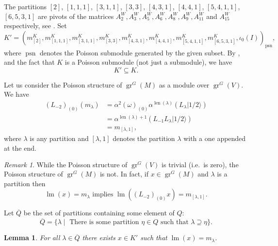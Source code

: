 \documentclass[12pt, a4paper]{article}
\newtheorem{lemma}[theorem]{Lemma}
\theoremstyle{remark}
\newtheorem{remark}[theorem]{Remark}
\DeclareMathOperator{\gr}{gr}
\DeclareMathOperator{\lm}{lm}
\DeclareMathOperator{\len}{len}
\DeclareMathOperator{\psn}{psn}
\newcommand{\vachalf}{|1/2\rangle}
\begin{document}
The partitions $[2]$, $[1, 1, 1]$, $[3, 1, 1]$, $[3, 3]$, $[4, 3, 1]$, $[4, 4, 1]$, $[5, 4, 1, 1]$, $[6, 5, 3, 1]$ are pivots of the matrices $A^W_2, A^W_3, A^W_5, A^W_6, A^W_8, A^W_9, A^W_{11}$ and $A^W_{15}$ respectively, see .
Set
\begin{equation*}
  K' = (m^K_{[2]}, m^K_{[1, 1, 1]}, m^K_{[3, 1, 1]}, m^K_{[3, 3]}, m^K_{[4, 3, 1]}, m^K_{[4, 4, 1]}, m^K_{[5, 4, 1, 1]}, m^K_{[6, 5, 3, 1]}, \iota_0(I))_{\psn},
\end{equation*}
where $\psn$ denotes the Poisson submodule generated by the given subset.
By ,  and the fact that $K$ is a Poisson submodule (not just a submodule), we have
\begin{equation*}
K' \subseteq K.
\end{equation*}

Let us consider the Poisson structure of $\gr^G(M)$ as a module over $\gr^G(V)$.
We have
\begin{align*}
  (L_{-2})_{(0)}(m_\lambda) &= \alpha^2(\omega)_{(0)}\alpha^{\len(\lambda)}(L_\lambda\vachalf) \\
  &= \alpha^{\len(\lambda) + 1}(L_{-1}L_\lambda\vachalf) \\
  &= m_{[\lambda, 1]},
\end{align*}
where $\lambda$ is any partition and $[\lambda, 1]$ denotes the partition $\lambda$ with a one appended at the end.
\begin{remark}
  \label{rmk:3}
  While the Poisson structure of $\gr^G(V)$ is trivial (i.e.\ is zero), the Poisson structure of $\gr^G(M)$ is not.
  In fact, if $x \in \gr^G(M)$ and $\lambda$ is a partition then
  \begin{equation*}
    \lm(x) = m_\lambda \text{ implies } \lm((L_{-2})_{(0)}x) = m_{[\lambda,1]}.
  \end{equation*}
\end{remark}

Let $\overline{Q}$ be the set of partitions containing some element of $Q$:
\begin{equation*}
  \overline{Q} = \{\lambda \mid \text{ There is some partition }\eta \in Q \text{ such that } \lambda \supseteq \eta\}.
\end{equation*}

\begin{lemma}
  \label{lmm:11}
  For all $\lambda \in \overline{Q}$ there exists $x \in K'$ such that $\lm(x) = m_\lambda$.
\end{lemma}
\end{document}
